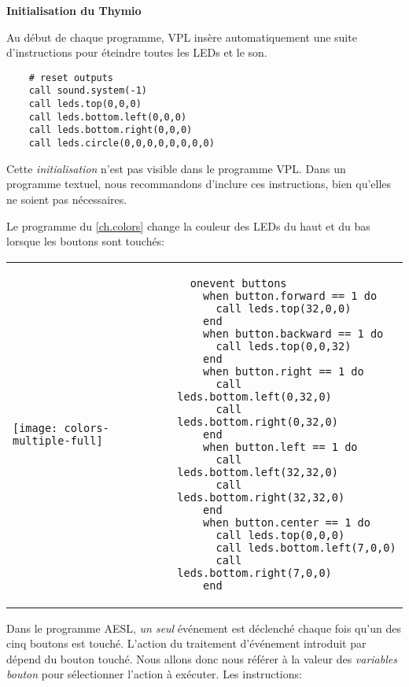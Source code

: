\textbf{\large Initialisation du Thymio}

Au début de chaque programme,
VPL insère automatiquement une suite d'instructions 
pour éteindre toutes les LEDs et le son.

\begin{footnotesize}
\begin{verbatim}
    # reset outputs
    call sound.system(-1)
    call leds.top(0,0,0)
    call leds.bottom.left(0,0,0)
    call leds.bottom.right(0,0,0)
    call leds.circle(0,0,0,0,0,0,0,0)
\end{verbatim}
\end{footnotesize}

Cette \emph{initialisation} n'est pas visible dans le programme VPL.
Dans un programme textuel, nous recommandons d'inclure ces instructions,
bien qu'elles ne soient pas nécessaires.

\newpage


Le programme  du \cref{ch.colors} change
la couleur des LEDs du haut et du bas lorsque les boutons sont touchés:

\begin{center}
\begin{tabular}{ll}
\texttt{[image: colors-multiple-full]} &
\begin{minipage}[b]{.5\textwidth}
\begin{footnotesize}
\begin{verbatim}
  onevent buttons
    when button.forward == 1 do
      call leds.top(32,0,0)
    end
    when button.backward == 1 do
      call leds.top(0,0,32)
    end
    when button.right == 1 do
      call leds.bottom.left(0,32,0)
      call leds.bottom.right(0,32,0)
    end
    when button.left == 1 do
      call leds.bottom.left(32,32,0)
      call leds.bottom.right(32,32,0)
    end
    when button.center == 1 do
      call leds.top(0,0,0)
      call leds.bottom.left(7,0,0)
      call leds.bottom.right(7,0,0)
    end
\end{verbatim}
\end{footnotesize}
\vspace*{5ex}
\end{minipage}
\end{tabular}
\end{center}

Dans le programme AESL, \emph{un seul} événement est déclenché chaque fois qu'un des cinq boutons
est touché.
L'action du traitement d'événement introduit par 
dépend du bouton touché. Nous allons donc nous référer à la valeur des \emph{variables bouton}
pour sélectionner l'action à exécuter.
Les instructions:

